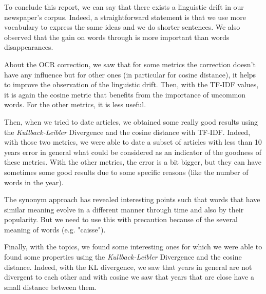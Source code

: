 To conclude this report, we can say that there exists a linguistic drift in our newspaper's corpus. Indeed, a straightforward statement is that we use more vocabulary to express the same ideas and we do shorter sentences. We also observed that the gain on words through is more important than words disappearances.

About the OCR correction, we saw that for some metrics the correction doesn't have any influence but for other ones (in particular for cosine distance), it helps to improve the observation of the linguistic drift. Then, with the TF-IDF values, it is again the cosine metric that benefits from the importance of uncommon words. For the other metrics, it is less useful.

Then, when we tried to date articles, we obtained some really good results using the \emph{Kullback-Leibler} Divergence and the cosine distance with TF-IDF. Indeed, with those two metrics, we were able to date a subset of articles with less than 10 years error in general what could be considered as an indicator of the goodness of these metrics. With the other metrics, the error is a bit bigger, but they can have sometimes some good results due to some specific reasons (like the number of words in the year).

The synonym approach has revealed interesting points such that words that have similar meaning evolve in a different manner through time and also by their popularity. But we need to use this with precaution because of the several meaning of words (e.g. "caisse"). 

Finally, with the topics, we found some interesting ones for which we were able to found some properties using the \emph{Kullback-Leibler} Divergence and the cosine distance. Indeed, with the KL divergence, we saw that years in general are not divergent to each other and with cosine we saw that years that are close have a small distance between them.